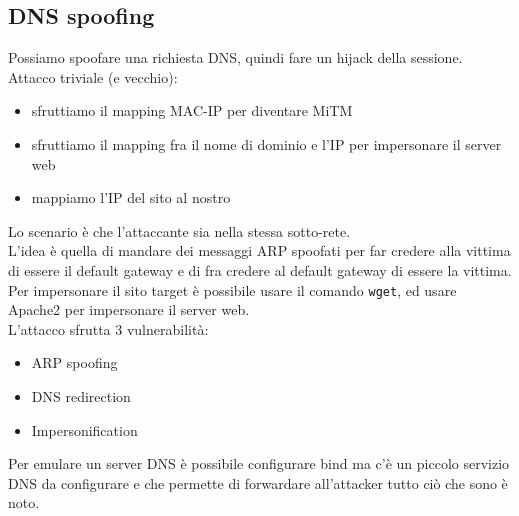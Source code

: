\documentclass[12pt, oneside]{extbook} %
\begin{document}
\subsection{DNS spoofing}
Possiamo spoofare una richiesta DNS, quindi fare un hijack della sessione.\\
Attacco triviale (e vecchio):
\begin{itemize}
    \item sfruttiamo il mapping MAC-IP per diventare MiTM
    \item sfruttiamo il mapping fra il nome di dominio e l'IP per impersonare il server web
    \item mappiamo l'IP del sito al nostro
\end{itemize}
Lo scenario è che l'attaccante sia nella stessa sotto-rete.
\\L'idea è quella di mandare dei messaggi ARP spoofati per far credere alla vittima di essere il default gateway e di fra credere al default gateway di essere la vittima.
\\Per impersonare il sito target è possibile usare il comando \texttt{wget}, ed usare Apache2 per impersonare il server web.
\\L'attacco sfrutta 3 vulnerabilità:
\begin{itemize}
    \item ARP spoofing
    \item DNS redirection
    \item Impersonification
\end{itemize}
Per emulare un server DNS è possibile configurare bind ma c'è un piccolo servizio DNS da configurare e che permette di forwardare all'attacker tutto ciò che sono è noto.
\end{document}
